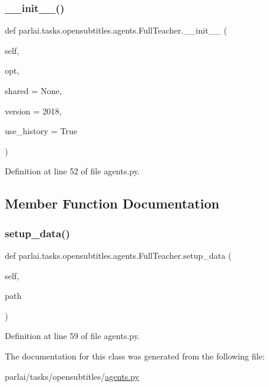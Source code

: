 \subsubsection{\texorpdfstring{\+\_\+\+\_\+init\+\_\+\+\_\+()}{\_\_init\_\_()}}
{\footnotesize\ttfamily def parlai.\+tasks.\+opensubtitles.\+agents.\+Full\+Teacher.\+\_\+\+\_\+init\+\_\+\+\_\+ (\begin{DoxyParamCaption}\item[{}]{self,  }\item[{}]{opt,  }\item[{}]{shared = {\ttfamily None},  }\item[{}]{version = {\ttfamily \textquotesingle{}2018\textquotesingle{}},  }\item[{}]{use\+\_\+history = {\ttfamily True} }\end{DoxyParamCaption})}



Definition at line 52 of file agents.\+py.



\subsection{Member Function Documentation}
\mbox{\label{classparlai_1_1tasks_1_1opensubtitles_1_1agents_1_1FullTeacher_abd9f716304f56c2b8b7f7573d34c87f6}} 
\subsubsection{\texorpdfstring{setup\+\_\+data()}{setup\_data()}}
{\footnotesize\ttfamily def parlai.\+tasks.\+opensubtitles.\+agents.\+Full\+Teacher.\+setup\+\_\+data (\begin{DoxyParamCaption}\item[{}]{self,  }\item[{}]{path }\end{DoxyParamCaption})}



Definition at line 59 of file agents.\+py.



The documentation for this class was generated from the following file\+:\begin{DoxyCompactItemize}
\item 
parlai/tasks/opensubtitles/\hyperlink{parlai_2tasks_2opensubtitles_2agents_8py}{agents.\+py}\end{DoxyCompactItemize}
